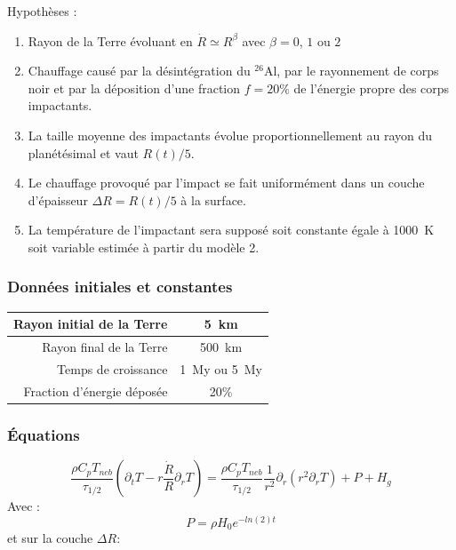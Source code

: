 \documentclass[10pt,a4paper]{article}
\numberwithin{equation}{section}
\begin{document}
Hypothèses : 
\begin{enumerate}
\item Rayon de la Terre évoluant en $\dot{R} \simeq R^\beta$ avec $\beta = 0$, $1$ ou $2$
\item Chauffage causé par la désintégration du $^{26}$Al, par le rayonnement de corps noir et par la déposition d'une fraction $f=20\%$ de l'énergie propre des corps impactants.
\item La taille moyenne des impactants évolue proportionnellement au rayon du planétésimal et vaut $R(t)/5$.
\item Le chauffage provoqué par l'impact se fait uniformément dans un couche d'épaisseur $\Delta R = R(t)/5$ à la surface.
\item La température de l'impactant sera supposé soit constante égale à \SI{1000}{K} soit variable estimée à partir du modèle 2.
\end{enumerate}

\subsubsection{Données initiales et constantes}

\begin{center}
  \begin{tabu}{ r  c }
    \hline
    Rayon initial de la Terre & \SI{5}{km} \\ \hline
    Rayon final de la Terre & \SI{500}{km} \\ \hline
    Temps de croissance & \SI{1}{My} ou \SI{5}{My}\\ \hline
    Fraction d'énergie déposée & 20\%       \\ \hline
  \end{tabu}
\end{center}

\subsubsection{Équations}

\begin{equation}
\frac{\rho C_p T_{neb}}{\tau_{1/2}} (\partial_{t} T -  r \frac{\dot{R}}{R} \partial_{r} T)= \frac{\rho C_p T_{neb}}{\tau_{1/2}} \frac{1}{r^2} \partial_{r} ( {r}^2 \partial_{r} T)  + P + H_g
\end{equation}
Avec :
\begin{equation}
 P = \rho H_0 e^{-ln(2) t} 
\end{equation}
et sur la couche $\Delta R$:
 
\end{document}
